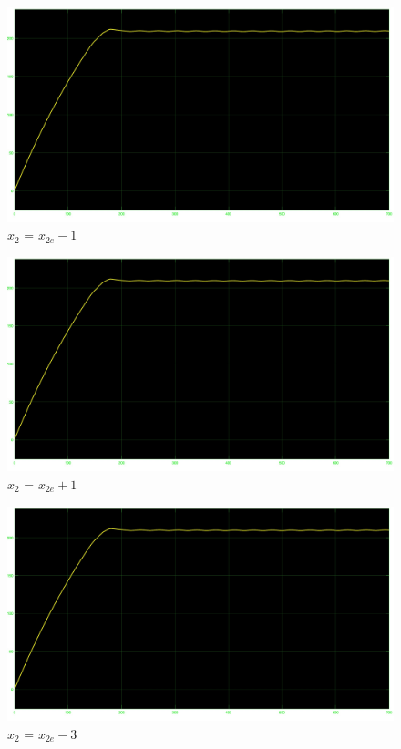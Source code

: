 \documentclass[a4paper, 11pt]{article}
\begin{document}
\begin{figure}[!h]
    \centering
    \includegraphics[scale=0.2]{punto_2/NonLin_x1e_x2e-1.jpg}
    \caption{$x_2$ = $x_{2e} - 1$}
    \label{fig:enter-label}
\end{figure}

\begin{figure}[!h]
    \centering
    \includegraphics[scale=0.2]{punto_2/NonLin_x1e_x2e+1.jpg}
    \caption{$x_2$ = $x_{2e} + 1$}
    \label{fig:enter-label}
\end{figure}

\begin{figure}[!h]
    \centering
    \includegraphics[scale=0.2]{punto_2/x2-3.jpg}
    \caption{$x_2$ = $x_{2e} - 3$}
    \label{fig:enter-label}
\end{figure}
\end{document}

